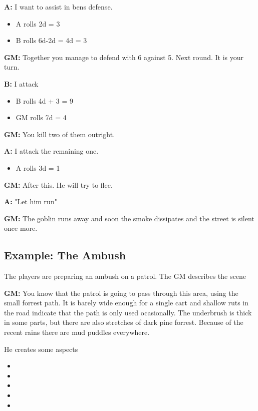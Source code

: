 \documentclass[11pt]{article}
\begin{document}
{\textbf{A:} I want to assist in bens defense.
\begin{itemize}
\item A rolls 2d = 3
\item B rolls 6d-2d = 4d = 3
\end{itemize}

\textbf{GM:} Together you manage to defend with 6 against 5. Next round. It is your turn.

\textbf{B:} I attack
\begin{itemize}
\item B rolls 4d + 3 = 9
\item GM rolls 7d = 4
\end{itemize}

\textbf{GM:} You kill two of them outright.

\textbf{A:} I attack the remaining one.
\begin{itemize}
\item A rolls 3d = 1
\end{itemize}

\textbf{GM:} After this. He will try to flee.

\textbf{A:} "Let him run"

\textbf{GM:} The goblin runs away and soon the smoke dissipates and the street is silent once more.

\subsection{Example: The Ambush}
\label{sec:org78da198}

The players are preparing an ambush on a patrol. The GM describes the scene

\textbf{GM:} You know that the patrol is going to pass through this area, using the small forrest path. It is barely wide enough for a single cart and shallow ruts in the road indicate that the path is only used ocasionally. The underbrush is thick in some parts, but there are also stretches of dark pine forrest. Because of the recent rains there are mud puddles everywhere.

He creates some aspects
\begin{itemize}
\item {}
\item {}
\item {}
\item {}
\item {}
\end{itemize}

}
\end{document}
